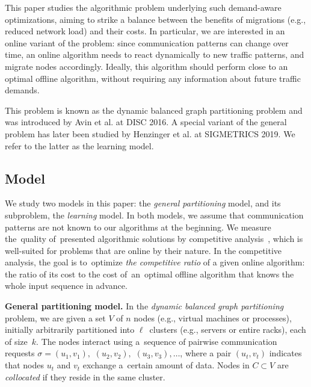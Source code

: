 \documentclass[a4paper,anonymous,USenglish]{lipics-v2019}
\begin{document}
This paper studies the algorithmic problem underlying such demand-aware
optimizations, aiming to strike a balance between the benefits of migrations (e.g., reduced network load) and their costs.
In particular, we are interested in an online variant of the problem: since communication patterns can change over time, an online algorithm needs to react dynamically to new traffic patterns, and migrate nodes  accordingly.
Ideally, this algorithm should perform close to an optimal offline algorithm, without requiring any information about future traffic demands. 

This problem is known as the dynamic balanced graph partitioning problem and was introduced by Avin et al. \cite{repartition-disc, sidma-arxiv} at DISC 2016. A special variant of the general problem has later been studied by Henzinger et al. \cite{sigmetrics19_partitioning} at SIGMETRICS 2019.
We refer to the latter as the learning model.



\subsection{Model}

We study two models in this paper: the \emph{general partitioning} model, and its subproblem, the \emph{learning} model.
In both models, we assume that communication patterns are not known to our algorithms at the beginning.
We measure the~quality of~presented algorithmic solutions by competitive analysis~\cite{borodin-book}, which is well-suited for problems that are online by their nature.
In the competitive analysis, the goal is to~optimize \emph{the competitive ratio} of a given online algorithm: the ratio of its cost to the cost of~an~optimal offline algorithm that knows the whole input sequence in advance.

\noindent
\textbf{General partitioning model.}
In the \emph{dynamic balanced graph partitioning} problem, we are given a set $V$ of $n$ nodes 
(e.g., virtual machines or processes),
initially arbitrarily partitioned into $\ell$~clusters
(e.g., servers or entire racks),
each of size~$k$.
The nodes interact using
a~sequence of pairwise communication requests
$\sigma = (u_1,v_1),$ $(u_2,v_2),$ $(u_3,v_3), \ldots$,
where a pair $(u_t,v_t)$ indicates that nodes $u_t$ and $v_t$ exchange a~certain amount of data.
Nodes in $C \subset V$ are \emph{collocated}
if they reside in the same cluster.
\end{document}
